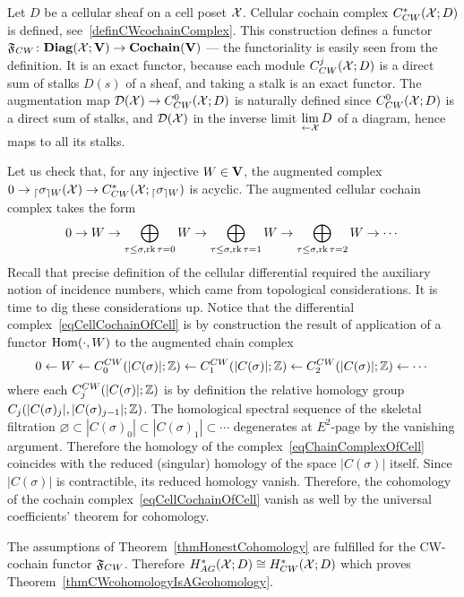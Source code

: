 \begin{ex}\label{exCell}
Let $D$ be a cellular sheaf on a cell poset $\mathcal{X}$. Cellular cochain complex $C^*_{CW}(\mathcal{X};D)$ is defined, see~\ref{definCWcochainComplex}. This construction defines a functor $\mathfrak{F}_{CW}\colon \mathbf{Diag}(\mathcal{X};\mathbf{V})\to \mathbf{Cochain}(\mathbf{V})$ --- the functoriality is easily seen from the definition. It is an exact functor, because each module $C^j_{CW}(\mathcal{X};D)$ is a direct sum of stalks $D(s)$ of a sheaf, and taking a stalk is an exact functor. The augmentation map $\mathcal{D}(\mathcal{X})\to C^0_{CW}(\mathcal{X};D)$ is naturally defined since $C^0_{CW}(\mathcal{X};D)$ is a direct sum of stalks, and $\mathcal{D}(\mathcal{X})$ in the inverse limit $\lim\limits_{\leftarrow \mathcal{X}}D$ of a diagram, hence maps to all its stalks.

Let us check that, for any injective $W\in\mathbf{V}$, the augmented complex $0\to{_{\lceil}\sigma_{\rceil W}}(\mathcal{X})\to C^*_{CW}(\mathcal{X};{_{\lceil}\sigma_{\rceil W}})$ is acyclic. The augmented cellular cochain complex takes the form
\begin{equation}\label{eqCellCochainOfCell}
0\to W\to \bigoplus_{\tau\leq\sigma, \operatorname{rk}\tau=0}W\to \bigoplus_{\tau\leq\sigma, \operatorname{rk}\tau=1} W\to \bigoplus_{\tau\leq\sigma, \operatorname{rk}\tau=2} W\to \cdots
\end{equation}
Recall that precise definition of the cellular differential required the auxiliary notion of incidence numbers, which came from topological considerations. It is time to dig these considerations up. Notice that the differential complex~\eqref{eqCellCochainOfCell} is by construction the result of application of a functor $\operatorname{Hom}(\cdot,W)$ to the augmented chain complex
\begin{equation}\label{eqChainComplexOfCell}
0\leftarrow W\leftarrow C_0^{CW}(|C(\sigma)|;\mathbb{Z})\leftarrow C_1^{CW}(|C(\sigma)|;\mathbb{Z})\leftarrow C_2^{CW}(|C(\sigma)|;\mathbb{Z})\leftarrow \cdots
\end{equation}
where each $C_j^{CW}(|C(\sigma)|;\mathbb{Z})$ is by definition the relative homology group $C_j(|C(\sigma)_j|,|C(\sigma)_{j-1}|;\mathbb{Z})$. The homological spectral sequence of the skeletal filtration $\varnothing\subset |C(\sigma)_0|\subset|C(\sigma)_1|\subset\cdots$ degenerates at $E^2$-page by the vanishing argument. Therefore the homology of the complex~\eqref{eqChainComplexOfCell} coincides with the reduced (singular) homology of the space $|C(\sigma)|$ itself. Since $|C(\sigma)|$ is contractible, its reduced homology vanish. Therefore, the cohomology of the cochain complex~\eqref{eqCellCochainOfCell} vanish as well by the universal coefficients' theorem for cohomology.

The assumptions of Theorem~\ref{thmHonestCohomology} are fulfilled for the CW-cochain functor $\mathfrak{F}_{CW}$. Therefore $H^*_{AG}(\mathcal{X};D)\cong H_{CW}^*(\mathcal{X};D)$ which proves Theorem~\ref{thmCWcohomologyIsAGcohomology}.
\end{ex}

